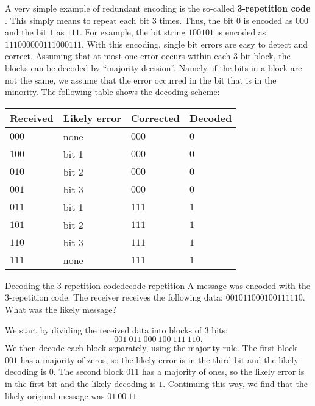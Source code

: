 A very simple example of redundant encoding is the so-called
\textbf{3-repetition code}%
%
%
. This simply means to repeat each bit 3
times. Thus, the bit $0$ is encoded as $000$ and the bit $1$ as
$111$. For example, the bit string $100101$ is encoded as
$111000000111000111$. With this encoding, single bit errors are easy
to detect and correct. Assuming that at most one error occurs within
each 3-bit block, the blocks can be decoded by ``majority
decision''. Namely, if the bits in a block are not the same, we assume
that the error occurred in the bit that is in the minority. The
following table shows the decoding scheme:
\begin{center}
  \begin{tabular}{|l|l|l|l|}
    \hline
    Received & Likely error & Corrected & Decoded \\\hline
    $000$    & none         & $000$     & $0$     \\
    $100$    & bit 1        & $000$     & $0$     \\
    $010$    & bit 2        & $000$     & $0$     \\
    $001$    & bit 3        & $000$     & $0$     \\
    $011$    & bit 1        & $111$     & $1$     \\
    $101$    & bit 2        & $111$     & $1$     \\
    $110$    & bit 3        & $111$     & $1$     \\
    $111$    & none         & $111$     & $1$     \\\hline
  \end{tabular}
\end{center}

\begin{example}{Decoding the 3-repetition code}{decode-repetition}
  A message was encoded with the 3-repetition code. The receiver
  receives the following data: $001011000100111110$. What was the
  likely message?
\end{example}

\begin{solution}
  We start by dividing the received data into blocks of 3 bits:
  \begin{equation*}
    001~011~000~100~111~110.
  \end{equation*}
  We then decode each block separately, using the majority rule.
  The first block $001$ has a majority of zeros, so the likely error is
  in the third bit and the likely decoding is $0$. The second block $011$
  has a majority of ones, so the likely error is in the first bit and
  the likely decoding is $1$. Continuing this way, we find that the
  likely original message was $01~00~11$.
\end{solution}

